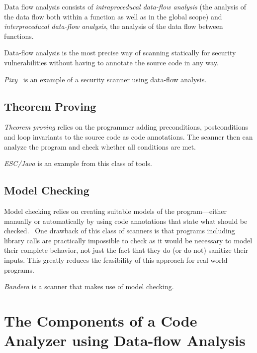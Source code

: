 Data flow analysis consists of \emph{intraproceducal data-flow analysis} (\ie the analysis of the data flow both within a function as well as in the global scope) and \emph{interproceducal data-flow analysis}, \ie the analysis of the data flow between functions.

Data-flow analysis is the most precise way of scanning statically for security vulnerabilities without having to annotate the source code in any way.~\cite{comparison-of-bug-finding-tools}

\emph{Pixy}~\cite{pixy} is an example of a security scanner using data-flow analysis.


\subsection{Theorem Proving}

\emph{Theorem proving} relies on the programmer adding preconditions, postconditions and loop invariants to the source code as code annotations. The scanner then can analyze the program and check whether all conditions are met.~\cite{comparison-of-bug-finding-tools}

\emph{ESC/Java} is an example from this class of tools.


\subsection{Model Checking}

Model checking relies on creating suitable models of the program---either manually or automatically by using code annotations that state what should be checked.~\cite{data-flow-analysis} One drawback of this class of scanners is that programs including library calls are practically impossible to check as it would be necessary to model their complete behavior, not just \eg the fact that they do (or do not) sanitize their inputs. This greatly reduces the 	feasibility of this approach for real-world programs.~\cite{comparison-of-bug-finding-tools}

\emph{Bandera} is a scanner that makes use of model checking.



\section{The Components of a Code Analyzer using Data-flow Analysis}

